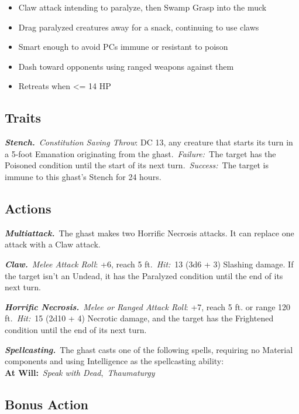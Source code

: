 \documentclass[10pt,twocolumn]{article}
\let\oldtextbf\textbf
\renewcommand{\textbf}[1]{\oldtextbf{{#1}}}
\providecommand{\tightlist}{
  \setlength{\itemsep}{4pt}
  \setlength{\topsep}{0pt}
  \setlength{\parsep}{0pt}
  \setlength{\parskip}{0pt}
  \setlength{\partopsep}{0pt}
}
\begin{document}
\setlength{\itemsep}{0pt}

\begin{itemize}
\tightlist
\item
  Claw attack intending to paralyze, then Swamp Grasp into the muck
\item
  Drag paralyzed creatures away for a snack, continuing to use claws
\item
  Smart enough to avoid PCs immune or resistant to poison
\item
  Dash toward opponents using ranged weapons against them
\item
  Retreats when \textless= 14 HP
\end{itemize}

\subsection{Traits}\label{traits-2}

\emph{\textbf{Stench.}}~\emph{Constitution Saving Throw}: DC 13, any
creature that starts its turn in a 5-foot Emanation originating from the
ghast.~\emph{Failure:}~The target has the Poisoned condition until the
start of its next turn.~\emph{Success:}~The target is immune to this
ghast's Stench for 24 hours.

\subsection{Actions}\label{actions-3}

\emph{\textbf{Multiattack.}}~The ghast makes two Horrific Necrosis
attacks. It can replace one attack with a Claw attack.

\emph{\textbf{Claw.}}~\emph{Melee Attack Roll}: +6, reach 5
ft.~\emph{Hit:}~13 (3d6 + 3) Slashing damage. If the target isn't an
Undead, it has the Paralyzed condition until the end of its next turn.

\emph{\textbf{Horrific Necrosis.}}~\emph{Melee or Ranged Attack Roll}:
+7, reach 5 ft. or range 120 ft.~\emph{Hit:}~15 (2d10 + 4) Necrotic
damage, and the target has the Frightened condition until the end of its
next turn.

\emph{\textbf{Spellcasting.}}~The ghast casts one of the following
spells, requiring no Material components and using Intelligence as the
spellcasting ability:\\
\textbf{At Will:}~\emph{Speak with Dead},~\emph{Thaumaturgy}

\subsection{Bonus Action}\label{bonus-action}
\end{document}
